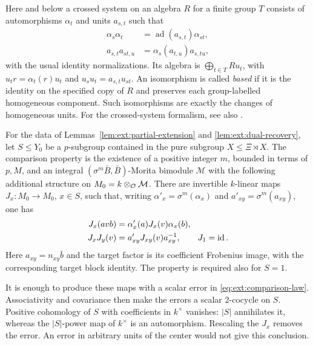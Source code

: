 Here and below a crossed system on an algebra $R$ for a finite group
$T$ consists of automorphisms $\alpha_t$ and units $a_{s,t}$ such that
\begin{align*}
 \alpha_s\alpha_t&=\operatorname{ad}(a_{s,t})\alpha_{st},\\
 a_{s,t}a_{st,u}&=\alpha_s(a_{t,u})a_{s,tu},
\end{align*}
with the usual identity normalizations.  Its algebra is
$\bigoplus_{t\in T}Ru_t$, with $u_t r=\alpha_t(r)u_t$ and
$u_su_t=a_{s,t}u_{st}$.  An isomorphism is called \emph{based} if it
is the identity on the specified copy of $R$ and preserves each
group-labelled homogeneous component.  Such isomorphisms are
exactly the changes of homogeneous units.
For the crossed-system formalism, see also
\cite[Definition~4.1 and Lemma~4.3]{EiseleReduction}.

\begin{definition}\label{def:ext:comparison-data}
For the data of Lemmas~\ref{lem:ext:partial-extension} and
\ref{lem:ext:dual-recovery}, let $S\leq Y_0$ be a $p$-subgroup
contained in the pure subgroup $X\leq\Xi\rtimes X$.  The comparison
property is the existence of a positive integer $m$, bounded in
terms of $p,M$, and an integral
$(\sigma^m\bar B,\bar B)$-Morita bimodule $\mathcal M$ with the
following additional structure on $M_0=k\otimes_{\mathcal O}\mathcal M$.
There are invertible $k$-linear maps $J_x:M_0\to M_0$, $x\in S$,
such that, writing $\alpha'_x=\sigma^m(\alpha_x)$ and
$a'_{xy}=\sigma^m(a_{xy})$, one has
\begin{align}
 J_x(avb)&=\alpha'_x(a)J_x(v)\alpha_x(b),
 \label{eq:ext:comparison-covariance}\\
 J_xJ_y(v)&=a'_{xy}J_{xy}(v)a_{xy}^{-1},\qquad J_1=\operatorname{id}.
 \label{eq:ext:comparison-law}
\end{align}
Here $a_{xy}=n_{xy}\bar b$ and the target factor is its coefficient
Frobenius image, with the corresponding target block identity.
The property is required also for $S=1$.
\end{definition}

It is enough to produce these maps with a scalar error in
\eqref{eq:ext:comparison-law}.  Associativity and covariance then
make the errors a scalar $2$-cocycle on $S$.  Positive cohomology
of $S$ with coefficients in $k^\times$ vanishes: $|S|$ annihilates
it, whereas the $|S|$-power map of $k^\times$ is an automorphism.
Rescaling the $J_x$ removes the error.  An error in arbitrary units
of the center would not give this conclusion.

